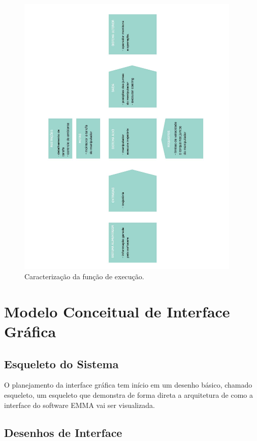 \documentclass[12pt,a4paper]{article}
\begin{document}
\begin{figure}[H]
\begin{center}
  \includegraphics[width=0.95\textwidth]{figs/caracterizacao_execucao.jpg}
  \caption{Caracterização da função de execução.}
  \label{fig:caracterizacao_execucao}
\end{center}
\end{figure} 


\section {Modelo Conceitual de Interface Gráfica}

\subsection {Esqueleto do Sistema}
O planejamento da interface gráfica tem início em um desenho básico, chamado
esqueleto, um esqueleto que demonstra de forma direta a arquitetura de como a
interface do software EMMA vai ser visualizada.

\subsection {Desenhos de Interface}
\end{document}
